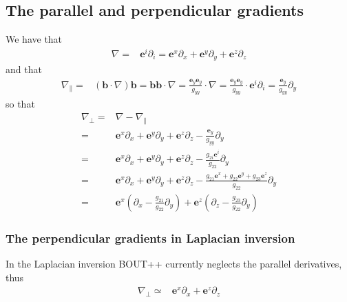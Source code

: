 \documentclass[12pt]{article}
\def\L{\left}
\def\R{\right}
\newcommand{\Grad}{\ensuremath{\nabla}}
\newcommand{\ve}[1]{\ensuremath{\boldsymbol{#1}}}
\begin{document}
\subsection{The parallel and perpendicular gradients}
%
We have that
%
\begin{align*}
    \Grad =& \ve{e}^i \partial_i
          = \ve{e}^x \partial_x + \ve{e}^y \partial_y + \ve{e}^z \partial_z
\end{align*}
%
and that
%
\begin{align*}
    \Grad_\| =& \L(\ve{b} \cdot \Grad\R) \ve{b}
             = \ve{b} \ve{b} \cdot \Grad
             = \frac{\ve{e}_y \ve{e}_y}{g_{yy}} \cdot \Grad
             = \frac{\ve{e}_y \ve{e}_y}{g_{yy}} \cdot \ve{e}^i \partial_i
             = \frac{\ve{e}_y}{g_{yy}} \partial_y
\end{align*}
%
so that
%
\begin{align*}
    \Grad_\perp =& \Grad - \Grad_\|\\
%
                =& \ve{e}^x \partial_x + \ve{e}^y \partial_y + \ve{e}^z
                   \partial_z - \frac{\ve{e}_y}{g_{yy}} \partial_y\\
%
                =& \ve{e}^x \partial_x + \ve{e}^y \partial_y + \ve{e}^z
                   \partial_z - \frac{g_{2i}\ve{e}^i}{g_{22}} \partial_y\\
%
                =& \ve{e}^x \partial_x + \ve{e}^y \partial_y + \ve{e}^z
                   \partial_z
                   - \frac{g_{21}\ve{e}^x
                          +g_{22}\ve{e}^y
                          +g_{23}\ve{e}^z
                          }{g_{22}}\partial_y\\
%
                =& \ve{e}^x \L(\partial_x - \frac{g_{21}}{g_{22}}\partial_y\R)
                +  \ve{e}^z \L(\partial_z - \frac{g_{23}}{g_{22}}\partial_y\R)
\end{align*}
%
\subsubsection{The perpendicular gradients in Laplacian inversion}
In the Laplacian inversion BOUT++ currently neglects the parallel derivatives,
thus
%
\begin{align*}
    \Grad_\perp \simeq&
        \ve{e}^x \partial_x
     +  \ve{e}^z \partial_z
\end{align*}
\end{document}
